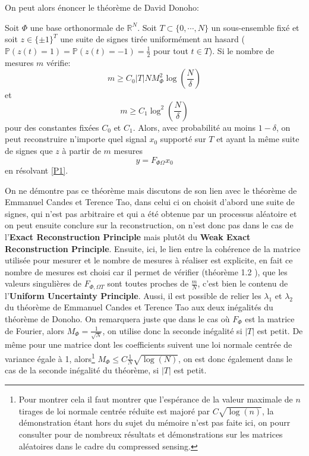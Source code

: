 On peut alors énoncer le théorème de David Donoho:
\begin{theoreme}
	Soit $\Phi$ une base orthonormale de $\mathbb{R}^N$. 
	Soit $T \subset \{0, \cdots, N\}$ un sous-ensemble fixé et soit $z \in \{\pm 1\}^T$ une suite de signes tirée uniformément au hasard ($\mathbb{P}(z(t) = 1) = \mathbb{P}(z(t) = -1) = \frac{1}{2}$ pour tout $t\in T$).
	Si le nombre de mesures $m$ vérifie:
	\begin{equation}
		m\geq C_0 |T| N M_{\Phi}^2 \log(\frac{N}{\delta})
	\end{equation}
	et
	\begin{equation}
		m\geq C_1 \log^2(\frac{N}{\delta})
	\end{equation}
	pour des constantes fixées $C_0$ et $C_1$.
	Alors, avec probabilité au moins $1-\delta$, on peut reconstruire n'importe quel signal $x_0$ supporté sur $T$ et ayant la même suite de signes que $z$ à partir de $m$ mesures
	\begin{equation}
		y = F_{\Phi \Omega} x_0
	\end{equation}
	en résolvant \ref{P1}.
\end{theoreme}
On ne démontre pas ce théorème mais discutons de son lien avec le théorème de Emmanuel Candes et Terence Tao, dans celui ci on choisit d'abord une suite de signes, qui n'est pas arbitraire et qui a été obtenue par un processus aléatoire et on peut ensuite conclure sur la reconstruction, on n'est donc pas dans le cas de l'\textbf{Exact Reconstruction Principle} mais plutôt du \textbf{Weak Exact Reconstruction Principle}.
\newline
Ensuite, ici, le lien entre la cohérence de la matrice utilisée pour mesurer et le nombre de mesures à réaliser est explicite, en fait ce nombre de mesures est choisi car il permet de vérifier (théorème 1.2 \cite{CR}), que les valeurs singulières de $F_{\Phi, \Omega T}$ sont toutes proches de $\frac{m}{N}$, c'est bien le contenu de l'\textbf{Uniform Uncertainty Principle}.
\newline
Aussi, il est possible de relier les $\lambda_1$ et $\lambda_2$ du théorème de Emmanuel Candes et Terence Tao aux deux inégalités du théorème de Donoho. 
On remarquera juste que dans le cas où $F_\Phi$ est la matrice de Fourier, alors $M_\Phi= \frac{1}{\sqrt{N}}$, on utilise donc la seconde inégalité si $|T|$ est petit.
De même pour une matrice dont les coefficients suivent une loi normale centrée de variance égale à 1, alors\footnote{Pour montrer cela il faut montrer que l'espérance de la valeur maximale de $n$ tirages de loi normale centrée réduite est majoré par $C\sqrt{\log(n)}$, la démonstration étant hors du sujet du mémoire n'est pas faite ici, on pourr consulter \cite{foucartbook} pour de nombreux résultats et démonstrations sur les matrices aléatoires dans le cadre du compressed sensing.} $M_\Phi \leq C\frac{1}{N}\sqrt{\log(N)}$, on est donc également dans le cas de la seconde inégalité du théorème, si $|T|$ est petit.
